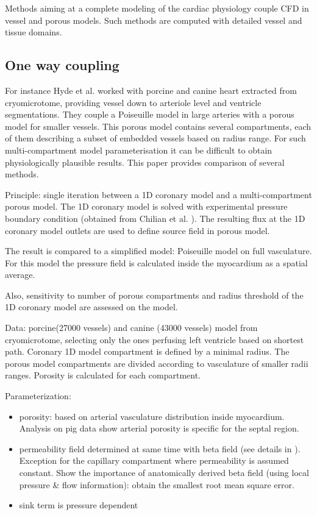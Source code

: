 \documentclass[a4paper, 11pt]{article} %
\begin{document}
Methods aiming at a complete modeling of the cardiac physiology couple CFD in vessel and porous models. Such methods are computed with detailed vessel and tissue domains. \\

\subsection*{One way coupling}
For instance Hyde et al.  \cite{hyde2014multi} worked with porcine and canine heart extracted from cryomicrotome, providing vessel down to
arteriole level and ventricle segmentations. They couple a Poiseuille model in large arteries with a porous model for smaller vessels. This porous model contains several compartments, each of them describing a subset of embedded vessels based on radius range. For such multi-compartment model parameterisation it can be difficult to obtain physiologically plausible results. This paper provides comparison of several methods.

Principle: single iteration between a 1D coronary model and a multi-compartment porous model.
The 1D coronary model is solved with experimental pressure boundary condition (obtained from Chilian et al. \cite{chilian1989redistribution}).
The resulting flux at the 1D coronary model outlets are used to define source field in porous model.


The result is compared to a simplified model: Poiseuille model on full vasculature. For this model the pressure field is calculated inside the myocardium as a spatial average.

Also, sensitivity to number of porous compartments and radius threshold of the 1D coronary model are assessed on the model. 

Data: porcine(27000 vessels) and canine (43000 vessels) model from cryomicrotome, selecting only the ones perfusing left ventricle based on shortest path. Coronary 1D model compartment is defined by a minimal radius. The porous model compartments are divided according to vasculature of smaller radii ranges. Porosity is calculated for each compartment.

Parameterization:
\begin{itemize}
\item porosity: based on arterial vasculature distribution inside myocardium. Analysis on pig data show arterial porosity is specific for the septal region.
\item permeability field determined at same time with beta field (see details in \cite{hyde2013parameterisation}). Exception for the capillary compartment where permeability is assumed constant.
Show the importance of anatomically derived beta field (using local pressure \& flow information): obtain the smallest root mean square error. 
\item sink term is pressure dependent
\end{itemize}  
\end{document}
